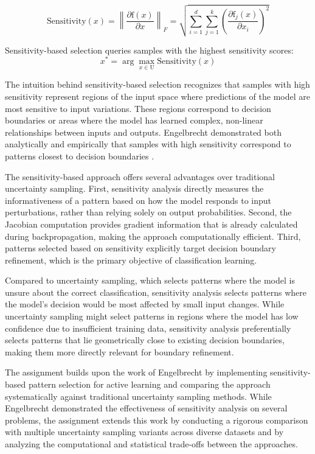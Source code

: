 \documentclass[conference]{IEEEtran}
\newcommand{\set}[1]{\mathrm{#1}}  %
\newcommand{\func}[1]{\mathrm{#1}} %
\begin{document}
\begin{equation}
\text{Sensitivity}(x) = \left\|\frac{\partial \func{f}(x)}{\partial x}\right\|_F = \sqrt{\sum_{i=1}^d \sum_{j=1}^k \left(\frac{\partial \func{f}_j(x)}{\partial x_i}\right)^2}
\end{equation}

Sensitivity-based selection queries samples with the highest sensitivity scores:
\begin{equation}
x^* = \arg\max_{x \in \set{U}} \text{Sensitivity}(x)
\end{equation}

The intuition behind sensitivity-based selection recognizes that samples with high sensitivity represent regions of the input space where predictions of the model are most sensitive to input variations. These regions correspond to decision boundaries or areas where the model has learned complex, non-linear relationships between inputs and outputs. Engelbrecht demonstrated both analytically and empirically that samples with high sensitivity correspond to patterns closest to decision boundaries \cite{engelbrecht2001sensitivity}.

The sensitivity-based approach offers several advantages over traditional uncertainty sampling. First, sensitivity analysis directly measures the informativeness of a pattern based on how the model responds to input perturbations, rather than relying solely on output probabilities. Second, the Jacobian computation provides gradient information that is already calculated during backpropagation, making the approach computationally efficient. Third, patterns selected based on sensitivity explicitly target decision boundary refinement, which is the primary objective of classification learning.

Compared to uncertainty sampling, which selects patterns where the model is unsure about the correct classification, sensitivity analysis selects patterns where the model's decision would be most affected by small input changes. While uncertainty sampling might select patterns in regions where the model has low confidence due to insufficient training data, sensitivity analysis preferentially selects patterns that lie geometrically close to existing decision boundaries, making them more directly relevant for boundary refinement.

The assignment builds upon the work of Engelbrecht \cite{engelbrecht2001sensitivity} by implementing sensitivity-based pattern selection for active learning and comparing the approach systematically against traditional uncertainty sampling methods. While Engelbrecht demonstrated the effectiveness of sensitivity analysis on several problems, the assignment extends this work by conducting a rigorous comparison with multiple uncertainty sampling variants across diverse datasets and by analyzing the computational and statistical trade-offs between the approaches.
\end{document}
